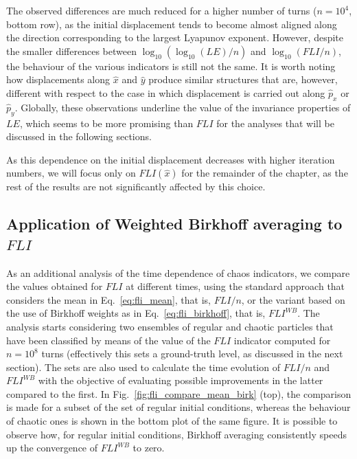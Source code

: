 The observed differences are much reduced for a higher number of turns ($n=10^4$, bottom row), as the initial displacement tends to become almost aligned along the direction corresponding to the largest Lyapunov exponent. However, despite the smaller differences between $\log_{10}(\log_{10}(LE)/n)$ and $\log_{10}(FLI/n)$, the behaviour of the various indicators is still not the same. It is worth noting how displacements along $\hat{x}$ and $\hat{y}$ produce similar structures that are, however, different with respect to the case in which displacement is carried out along $\hat{p}_x$ or $\hat{p}_y$. Globally, these observations underline the value of the invariance properties of $LE$, which seems to be more promising than $FLI$ for the analyses that will be discussed in the following sections.

As this dependence on the initial displacement decreases with higher iteration numbers, we will focus only on $FLI(\hat{x})$ for the remainder of the chapter, as the rest of the results are not significantly affected by this choice.

%
\subsection{Application of Weighted Birkhoff averaging to $FLI$}\label{subsec:dyn:FLI:WB}
%
As an additional analysis of the time dependence of chaos indicators, we compare the values obtained for $FLI$ at different times, using the standard approach that considers the mean in Eq.~\eqref{eq:fli_mean}, that is, $FLI/n$, or the variant based on the use of Birkhoff weights as in Eq.~\eqref{eq:fli_birkhoff}, that is, $FLI^{WB}$. The analysis starts considering two ensembles of regular and chaotic particles that have been classified by means of the value of the $FLI$ indicator computed for $n=10^8$ turns (effectively this sets a ground-truth level, as discussed in the next section). The sets are also used to calculate the time evolution of $FLI/n$ and $FLI^{WB}$ with the objective of evaluating possible improvements in the latter compared to the first. In Fig.~\ref{fig:fli_compare_mean_birk} (top), the comparison is made for a subset of the set of regular initial conditions, whereas the behaviour of chaotic ones is shown in the bottom plot of the same figure. It is possible to observe how, for regular initial conditions, Birkhoff averaging consistently speeds up the convergence of $FLI^{WB}$ to zero.

